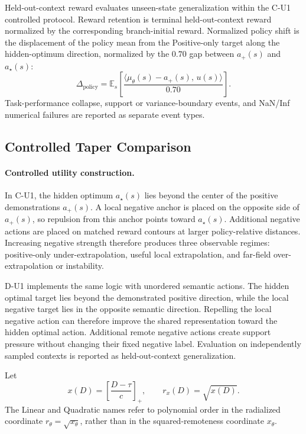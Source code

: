 \documentclass{article}
\theoremstyle{plain}
\theoremstyle{definition}
\theoremstyle{remark}
\begin{document}
Held-out-context reward evaluates unseen-state generalization within the
C-U1 controlled protocol. Reward retention is terminal held-out-context reward
normalized by the corresponding branch-initial reward. Normalized policy shift
is the displacement of the policy mean from the Positive-only target along the
hidden-optimum direction, normalized by the \(0.70\) gap between \(a_+(s)\)
and \(a_\star(s)\):
\[
\Delta_{\mathrm{policy}}
=
\mathbb E_s
\left[
\frac{
\langle \mu_\theta(s)-a_+(s),\,u(s)\rangle
}{
0.70
}
\right].
\]
Task-performance collapse, support or variance-boundary events, and
NaN/Inf numerical failures are reported as separate event types.


\subsection{Controlled Taper Comparison}
\label{app:controlled_taper_protocol}

\paragraph{Controlled utility construction.}
In C-U1, the hidden optimum $a_\star(s)$ lies beyond the center of the
positive demonstrations $a_+(s)$. A local negative anchor is placed on
the opposite side of $a_+(s)$, so repulsion from this anchor points
toward $a_\star(s)$. Additional negative actions are placed on matched
reward contours at larger policy-relative distances. Increasing
negative strength therefore produces three observable regimes:
positive-only under-extrapolation, useful local extrapolation, and
far-field over-extrapolation or instability.

D-U1 implements the same logic with unordered semantic actions. The
hidden optimal target lies beyond the demonstrated positive direction,
while the local negative target lies in the opposite semantic
direction. Repelling the local negative action can therefore improve
the shared representation toward the hidden optimal action. Additional
remote negative actions create support pressure without changing their
fixed negative label. Evaluation on independently sampled contexts is
reported as held-out-context generalization.

Let
\[
x(D)
=
\left[
\frac{D-\tau}{c}
\right]_{+},
\qquad
r_x(D)=\sqrt{x(D)}.
\]
The Linear and Quadratic names refer to polynomial order in the
radialized coordinate \(r_\theta=\sqrt{x_\theta}\), rather than in the
squared-remoteness coordinate \(x_\theta\).
\end{document}
